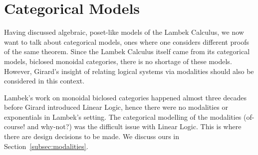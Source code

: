 \documentclass{entcs}
\begin{document}



\section{Categorical Models}

Having discussed algebraic, poset-like models of the Lambek Calculus,
we now want to talk about categorical models, ones where one considers
different proofs of the same theorem. Since the Lambek Calculus itself
came from its categorical models, biclosed monoidal categories, there
is no shortage of these models. However, Girard's insight of relating
logical systems via modalities should also be considered in this
context.

Lambek's work on monoidal biclosed categories happened almost three
decades before Girard introduced Linear Logic, hence there were no
modalities or exponentials in Lambek's setting. The categorical
modelling of the modalities (of-course! and why-not?) was the
difficult issue with Linear Logic.
This is where there are design decisions to be made. We discuss ours
in Section~\ref{subsec:modalities}.
\end{document}
